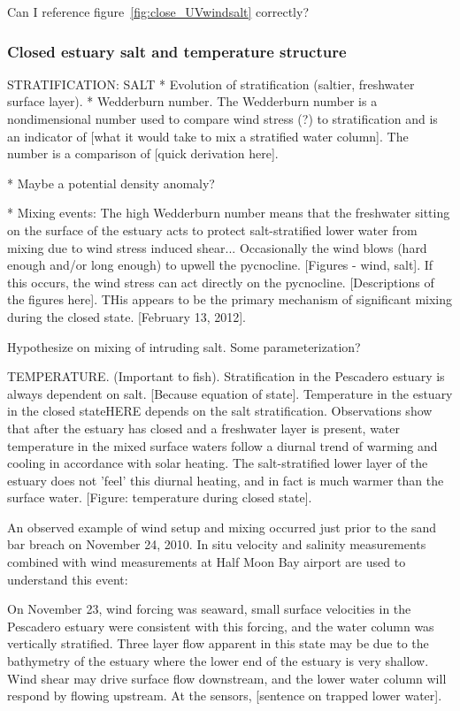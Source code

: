 Can I reference figure~\ref{fig:close_UVwindsalt} correctly?


\subsubsection{Closed estuary salt and temperature structure} \label{cl_strat}
STRATIFICATION: SALT * Evolution of stratification (saltier, freshwater
surface layer). * Wedderburn number. The Wedderburn number is a
nondimensional number used to compare wind stress (?) to stratification
and is an indicator of [what it would take to mix a stratified water
column]. The number is a comparison of [quick derivation here].


* Maybe a potential density anomaly?


* Mixing events: The high Wedderburn number means that the freshwater
sitting on the surface of the estuary acts to protect salt-stratified
lower water from mixing due to wind stress induced shear... Occasionally
the wind blows (hard enough and/or long enough) to upwell the
pycnocline. [Figures - wind, salt]. If this occurs, the wind stress can
act directly on the pycnocline. [Descriptions of the figures here]. 
THis appears to be the primary mechanism of significant mixing during
the closed state.  [February 13, 2012].



Hypothesize on mixing of intruding salt. Some parameterization?

TEMPERATURE. (Important to fish). Stratification in the Pescadero
estuary is always dependent on salt. [Because equation of state].
Temperature in the estuary in the closed state{HERE} depends on the salt
stratification. Observations show that after the estuary has closed and
a freshwater layer is present, water temperature in the mixed surface
waters follow a diurnal trend of warming and cooling in accordance with
solar heating. The salt-stratified lower layer of the estuary does not
'feel' this diurnal heating, and in fact is much warmer than the surface
water. [Figure: temperature during closed state].


An observed example of wind setup and mixing occurred just prior to the
sand bar breach on November 24, 2010. In situ velocity and salinity
measurements combined with wind measurements at Half Moon Bay airport
are used to understand this event:

On November 23, wind forcing was seaward, small surface velocities in
the Pescadero estuary were consistent with this forcing, and the water
column was vertically stratified. Three layer flow apparent in this
state may be due to the bathymetry of the estuary where the lower end of
the estuary is very shallow. Wind shear may drive surface flow
downstream, and the lower water column will respond by flowing upstream.
At the sensors, [sentence on trapped lower water].

